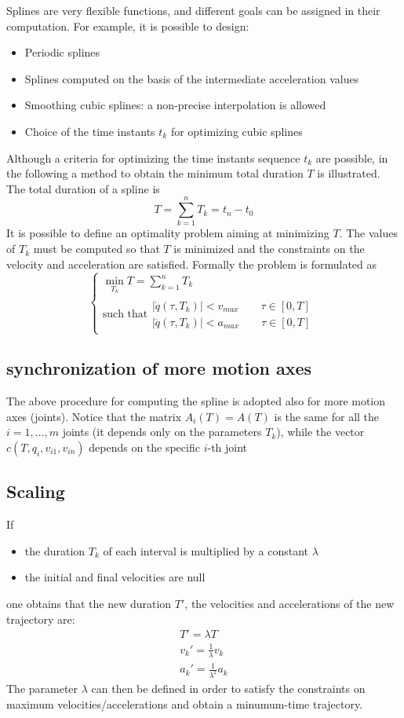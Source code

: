\documentclass{book}
\begin{document}
Splines are very flexible functions, and different goals can be assigned in their computation. For example, it is possible to design: 
\begin{itemize}
  \item Periodic splines 
  \item Splines computed on the basis of the intermediate acceleration values 
  \item Smoothing cubic splines: a non-precise interpolation is allowed 
  \item Choice of the time instants $t_k$ for optimizing cubic splines 
\end{itemize}

Although a criteria for optimizing the time instants sequence $t_k$ are possible, in the following a method to obtain the minimum total duration $T$ is illustrated. The total duration of a spline is 
\[
  T=\displaystyle\sum_{k=1}^{n}T_k=t_n-t_0
\]
It is possible to define an optimality problem aiming at minimizing $T$. The values of $T_k$ must be computed so that $T$ is minimized and the constraints on the velocity and acceleration are satisfied. Formally the problem is formulated as 
\[
  \begin{cases}
    \min_{T_k}T=\displaystyle\sum_{k=1}^{n}T_k\\
    \text{such that} \begin{array}{l}
        |\dot{q}(\tau,T_k)|<v_{max} \qquad \tau\in[0,T]\\
        |\ddot{q}(\tau,T_k)|<a_{max} \qquad \tau\in[0,T]
    \end{array}
  \end{cases}
\]

\subsection{synchronization of more motion axes}
The above procedure for computing the spline is adopted also for more motion axes (joints). Notice that the matrix $A_i(T)=A(T)$ is the same for all the $i=1,\dots,m$ joints (it depends only on the parameters $T_k$), while the vector $c(T,q_i,v_{i1},v_{in})$ depends on the specific $i$-th joint

\subsection{Scaling}
If 
\begin{itemize}
  \item the duration $T_k$ of each interval is multiplied by a constant $\lambda$ 
    \item the initial and final velocities are null
\end{itemize}
one obtains that the new duration $T'$, the velocities and accelerations of the new trajectory are: 
\begin{gather*}
  T'= \lambda T \\
  v_k' = \displaystyle\frac{1}{\lambda} v_k\\
  a_k' = \displaystyle\frac{1}{\lambda^2} a_k
\end{gather*}
The parameter $\lambda$ can then be defined in order to satisfy the constraints on maximum velocities/accelerations and obtain a minumum-time trajectory.
\end{document}
